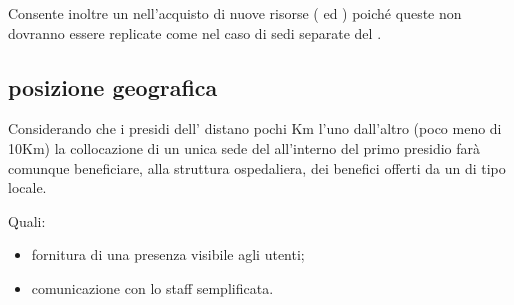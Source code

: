 Consente inoltre un  nell'acquisto di nuove risorse ( ed ) poiché queste non dovranno essere replicate come nel caso di sedi separate del .

\subsection[Posizione geografica]{posizione geografica}
\label{sd-structure-position}
Considerando che i presidi dell'\entity{} distano pochi Km l'uno dall'altro (poco meno di 10Km) la collocazione di un unica sede del  all'interno del primo presidio farà comunque beneficiare, alla struttura ospedaliera, dei benefici offerti da un  di tipo locale.

Quali:

\begin{itemize}
\item{fornitura di una presenza visibile agli utenti;}
\item{comunicazione con lo staff semplificata.}
\end{itemize}